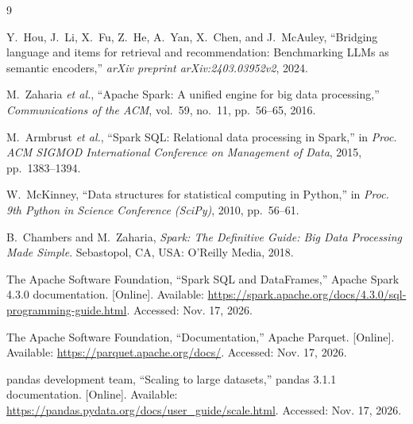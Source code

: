 \documentclass[11pt,a4paper]{article}
\begin{document}
\begin{thebibliography}{9}

Y.~Hou, J.~Li, X.~Fu, Z.~He, A.~Yan, X.~Chen, and J.~McAuley, ``Bridging language and items
for retrieval and recommendation: Benchmarking LLMs as semantic encoders,'' \emph{arXiv
preprint arXiv:2403.03952v2}, 2024.

M.~Zaharia \emph{et al.}, ``Apache Spark: A unified engine for big data processing,''
\emph{Communications of the ACM}, vol.~59, no.~11, pp.~56--65, 2016.

M.~Armbrust \emph{et al.}, ``Spark SQL: Relational data processing in Spark,'' in
\emph{Proc. ACM \mbox{SIGMOD} International Conference on Management of Data}, 2015,
pp.~1383--1394.

W.~McKinney, ``Data structures for statistical computing in Python,'' in \emph{Proc. 9th
Python in Science Conference (SciPy)}, 2010, pp.~56--61.

B.~Chambers and M.~Zaharia, \emph{Spark: The Definitive Guide: Big Data Processing Made
Simple}. Sebastopol, CA, USA:
O'Reilly Media, 2018.

The Apache Software Foundation, ``Spark SQL and DataFrames,'' Apache Spark 4.3.0
documentation. [Online]. Available:
\url{https://spark.apache.org/docs/4.3.0/sql-programming-guide.html}. Accessed: Nov. 17,
2026.

The Apache Software Foundation, ``Documentation,'' Apache Parquet. [Online]. Available:
\url{https://parquet.apache.org/docs/}. Accessed: Nov. 17, 2026.

pandas development team, ``Scaling to large datasets,'' pandas 3.1.1 documentation.
[Online]. Available: \url{https://pandas.pydata.org/docs/user_guide/scale.html}.
Accessed: Nov. 17, 2026.

\end{thebibliography}
\end{document}
